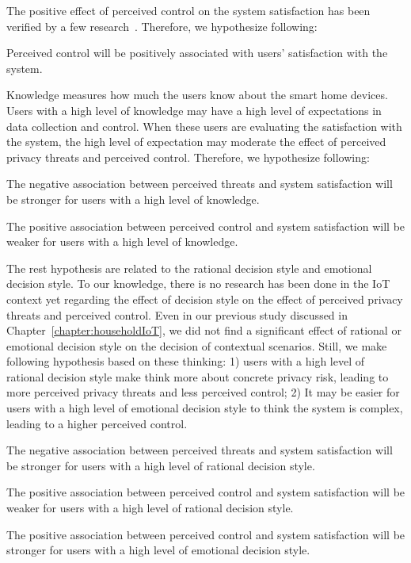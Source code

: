 The positive effect of perceived control on the system satisfaction has been verified by a few research~\cite{malhotra2004internet, madejski2012study}. Therefore, we hypothesize following:
\begin{theorem}
	Perceived control will be positively associated with users' satisfaction with the system.
\end{theorem}

Knowledge measures how much the users know about the smart home devices. Users with a high level of knowledge may have a high level of expectations in data collection and control. When these users are evaluating the satisfaction with the system, the high level of expectation may moderate the effect of perceived privacy threats and perceived control. Therefore, we hypothesize following:
\theoremgroup
\begin{theorem}
	The negative association between perceived threats and system satisfaction will be stronger for users with a high level of knowledge.
\end{theorem}
\begin{theorem}
	The positive association between perceived control and system satisfaction will be weaker for users with a high level of knowledge.
\end{theorem}

The rest hypothesis are related to the rational decision style and emotional decision style. To our knowledge, there is no research has been done in the IoT context yet regarding the effect of decision style on the effect of perceived privacy threats and perceived control. Even in our previous study discussed in Chapter~\ref{chapter:householdIoT}, we did not find a significant effect of rational or emotional decision style on the decision of contextual scenarios. Still, we make following hypothesis based on these thinking: 1) users with a high level of rational decision style make think more about concrete privacy risk, leading to more perceived privacy threats and less perceived control; 2) It may be easier for users with a high level of emotional decision style to think the system is complex, leading to a higher perceived control.
\theoremgroup
\begin{theorem}
	The negative association between perceived threats and system satisfaction will be stronger for users with a high level of rational decision style.
\end{theorem}
\begin{theorem}
	The positive association between perceived control and system satisfaction will be weaker for users with a high level of rational decision style.
\end{theorem}
\begin{theorem}
	The positive association between perceived control and system satisfaction will be stronger for users with a high level of emotional decision style.
\end{theorem}

